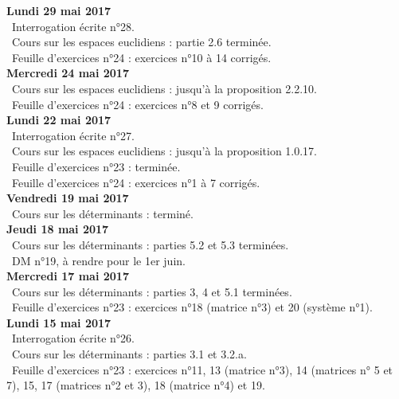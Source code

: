 \documentclass[12pt,a4paper]{article}
\begin{document}
\noindent\textbf{Lundi 29 mai 2017}\\
\bu\ Interrogation écrite n°28.\\
\bu\ Cours sur les espaces euclidiens : partie 2.6 terminée.\\
\bu\ Feuille d'exercices n°24 : exercices n°10 à 14 corrigés.\vspace{.4cm}\\

\noindent\textbf{Mercredi 24 mai 2017}\\
\bu\ Cours sur les espaces euclidiens : jusqu'à la proposition 2.2.10.\\
\bu\ Feuille d'exercices n°24 : exercices n°8 et 9 corrigés.\vspace{.4cm}\\

\noindent\textbf{Lundi 22 mai 2017}\\
\bu\ Interrogation écrite n°27. \\
\bu\ Cours sur les espaces euclidiens : jusqu'à la proposition 1.0.17.\\
\bu\ Feuille d'exercices n°23 : terminée.\\
\bu\ Feuille d'exercices n°24 : exercices n°1 à 7 corrigés.\vspace{.4cm}\\

\noindent\textbf{Vendredi 19  mai 2017}\\
\bu\ Cours sur les déterminants : terminé.\vspace{.4cm}\\

\noindent\textbf{Jeudi 18  mai 2017}\\
\bu\ Cours sur les déterminants : parties 5.2 et 5.3 terminées.\\
\bu\ DM n°19, à rendre pour le 1er  juin.\vspace{.4cm}\\

\noindent\textbf{Mercredi 17  mai 2017}\\
\bu\ Cours sur les déterminants : parties 3, 4 et 5.1 terminées.\\
\bu\ Feuille d'exercices n°23 : exercices n°18 (matrice n°3) et 20 (système n°1).\vspace{.4cm}\\

\noindent\textbf{Lundi 15  mai 2017}\\
\bu\ Interrogation écrite n°26.\\
\bu\ Cours sur les déterminants : parties 3.1 et 3.2.a.\\
\bu\ Feuille d'exercices n°23 : exercices n°11, 13 (matrice n°3), 14 (matrices n° 5 et 7), 15, 17 (matrices n°2 et 3), 18 (matrice n°4) et 19.\vspace{.4cm}\\
\end{document}
